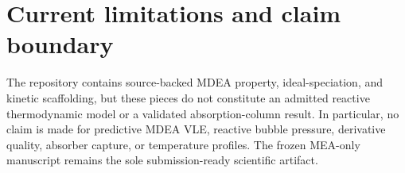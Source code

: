 \section{Current limitations and claim boundary}

The repository contains source-backed MDEA property, ideal-speciation, and kinetic scaffolding,
but these pieces do not constitute an admitted reactive thermodynamic model or a validated
absorption-column result. In particular, no claim is made for predictive MDEA VLE, reactive
bubble pressure, derivative quality, absorber capture, or temperature profiles. The frozen
MEA-only manuscript remains the sole submission-ready scientific artifact.
